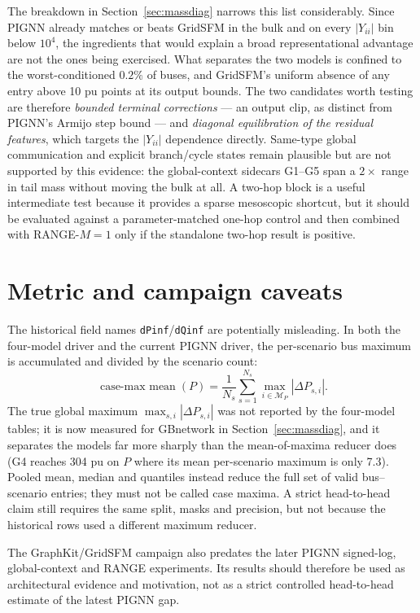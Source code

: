 \documentclass[10pt]{article}
\begin{document}
The breakdown in Section~\ref{sec:massdiag} narrows this list considerably.
Since PIGNN already matches or beats GridSFM in the bulk and on every
$|Y_{ii}|$ bin below $10^{4}$, the ingredients that would explain a broad
representational advantage are not the ones being exercised.  What separates
the two models is confined to the worst-conditioned $0.2\%$ of buses, and
GridSFM's uniform absence of any entry above 10 pu points at its output bounds.
The two candidates worth testing are therefore \emph{bounded terminal
corrections} --- an output clip, as distinct from PIGNN's Armijo step bound ---
and \emph{diagonal equilibration of the residual features}, which targets the
$|Y_{ii}|$ dependence directly.  Same-type global communication and explicit
branch/cycle states remain plausible but are not supported by this evidence:
the global-context sidecars G1--G5 span a $2\times$ range in tail mass without
moving the bulk at all.  A
two-hop block is a useful intermediate test because it provides a sparse
mesoscopic shortcut, but it should be evaluated against a parameter-matched
one-hop control and then combined with RANGE-$M=1$ only if the standalone
two-hop result is positive.

\section{Metric and campaign caveats}

The historical field names \texttt{dPinf}/\texttt{dQinf} are potentially
misleading.  In both the four-model driver and the current PIGNN driver, the
per-scenario bus maximum is accumulated and divided by the scenario count:
\[
  \operatorname{case\text{-}max\ mean}(P)
  =\frac{1}{N_s}\sum_{s=1}^{N_s}\max_{i\in\mathcal M_P}|\Delta P_{s,i}|.
\]
The true global maximum $\max_{s,i}|\Delta P_{s,i}|$ was not reported by the
four-model tables; it is now measured for GBnetwork in
Section~\ref{sec:massdiag}, and it separates the models far more sharply than
the mean-of-maxima reducer does (G4 reaches 304 pu on $P$ where its mean
per-scenario maximum is only 7.3).  Pooled mean, median and quantiles instead reduce the full
set of valid bus--scenario entries; they must not be called case maxima.  A
strict head-to-head claim still requires the same split, masks and precision,
but not because the historical rows used a different maximum reducer.

The GraphKit/GridSFM campaign also predates the later PIGNN signed-log,
global-context and RANGE experiments.  Its results should therefore be used
as architectural evidence and motivation, not as a strict controlled
head-to-head estimate of the latest PIGNN gap.
\end{document}
